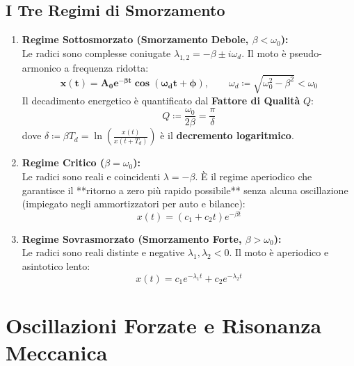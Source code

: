 \subsection{I Tre Regimi di Smorzamento}

\begin{enumerate}
    \item \textbf{Regime Sottosmorzato (Smorzamento Debole, $\beta < \omega_0$):}\\
    Le radici sono complesse coniugate $\lambda_{1,2} = -\beta \pm i\omega_d$. Il moto è pseudo-armonico a frequenza ridotta:
    \begin{equation}
        \mathbf{x(t) = A_0 e^{-\beta t} \cos(\omega_d t + \phi)}, \qquad \omega_d \coloneqq \sqrt{\omega_0^2 - \beta^2} < \omega_0
        \label{eq:sottosmorzato}
    \end{equation}
    Il decadimento energetico è quantificato dal \textbf{Fattore di Qualità} $Q$:
    \begin{equation}
        Q \coloneqq \frac{\omega_0}{2\beta} = \frac{\pi}{\delta}
    \end{equation}
    dove $\delta \coloneqq \beta T_d = \ln\left(\frac{x(t)}{x(t+T_d)}\right)$ è il \textbf{decremento logaritmico}.

    \item \textbf{Regime Critico ($\beta = \omega_0$):}\\
    Le radici sono reali e coincidenti $\lambda = -\beta$. È il regime aperiodico che garantisce il **ritorno a zero più rapido possibile** senza alcuna oscillazione (impiegato negli ammortizzatori per auto e bilance):
    \begin{equation}
        x(t) = (c_1 + c_2 t) e^{-\beta t}
    \end{equation}

    \item \textbf{Regime Sovrasmorzato (Smorzamento Forte, $\beta > \omega_0$):}\\
    Le radici sono reali distinte e negative $\lambda_1, \lambda_2 < 0$. Il moto è aperiodico e asintotico lento:
    \begin{equation}
        x(t) = c_1 e^{-\lambda_1 t} + c_2 e^{-\lambda_2 t}
    \end{equation}
\end{enumerate}

\section{Oscillazioni Forzate e Risonanza Meccanica}
\label{sec:oscillazioni_forzate}

